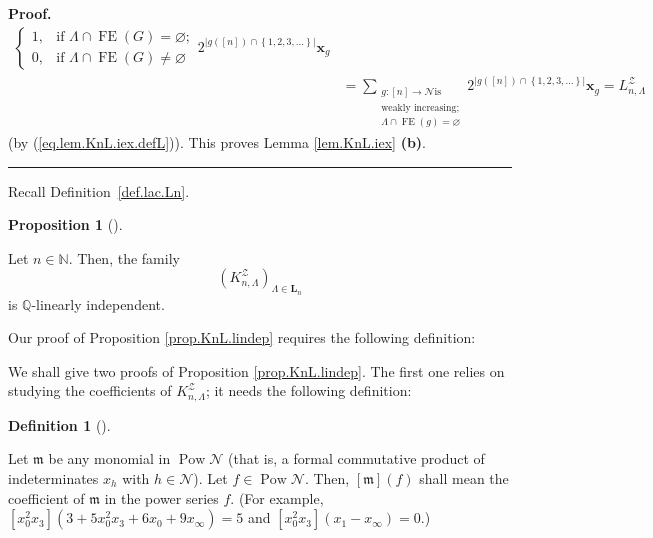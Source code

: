 \documentclass[numbers=enddot,12pt,final,onecolumn,notitlepage]{scrartcl}%
\theoremstyle{definition}
\newtheorem{prop}[theo]{Proposition}
\newenvironment{proposition}[1][]
{\begin{prop}[#1]\begin{leftbar}}
{\end{leftbar}\end{prop}}
\newtheorem{defi}[theo]{Definition}
\newenvironment{definition}[1][]
{\begin{defi}[#1]\begin{leftbar}}
{\end{leftbar}\end{defi}}
\newenvironment{proof}[1][Proof]{\noindent\textbf{#1.} }{\ \rule{0.5em}{0.5em}}
\newenvironment{verlong}{}{}
\newenvironment{vershort}{}{}
\let\sumnonlimits\sum
\renewcommand{\sum}{\sumnonlimits\limits}
\begin{document}
\begin{verlong}
\begin{proof}
\begin{align*}
\begin{cases}
1, & \text{if }\Lambda\cap\operatorname*{FE}\left(  G\right)  =\varnothing;\\
0, & \text{if }\Lambda\cap\operatorname*{FE}\left(  G\right)  \neq\varnothing
\end{cases}
2^{\left\vert g\left(  \left[  n\right]  \right)  \cap\left\{  1,2,3,\ldots
\right\}  \right\vert }\mathbf{x}_{g}\\
&  =\sum_{\substack{g:\left[  n\right]  \rightarrow\mathcal{N}\text{
is}\\\text{weakly increasing;}\\\Lambda\cap\operatorname*{FE}\left(  g\right)
=\varnothing}}2^{\left\vert g\left(  \left[  n\right]  \right)  \cap\left\{
1,2,3,\ldots\right\}  \right\vert }\mathbf{x}_{g}=L_{n,\Lambda}^{\mathcal{Z}}%
\end{align*}
(by (\ref{eq.lem.KnL.iex.defL})). This proves Lemma \ref{lem.KnL.iex}
\textbf{(b)}.
\end{proof}
\end{verlong}

Recall Definition~\ref{def.lac.Ln}.

\begin{proposition}
\label{prop.KnL.lindep}Let $n\in\mathbb{N}$. Then, the family%
\[
\left(  K_{n,\Lambda}^{\mathcal{Z}}\right)  _{\Lambda\in \mathbf{L}_n}%
\]
is $\mathbb{Q}$-linearly independent.
\end{proposition}

\begin{vershort}
Our proof of Proposition \ref{prop.KnL.lindep} requires
the following definition:
\end{vershort}

\begin{verlong}
We shall give two proofs of Proposition \ref{prop.KnL.lindep}. The first one
relies on studying the coefficients of $K_{n,\Lambda}^{\mathcal{Z}}$; it needs
the following definition:
\end{verlong}

\begin{definition}
Let $\mathfrak{m}$ be any monomial in $\operatorname*{Pow}\mathcal{N}$ (that
is, a formal commutative product of indeterminates $x_{h}$ with $h\in
\mathcal{N}$). Let $f\in\operatorname*{Pow}\mathcal{N}$. Then, $\left[
\mathfrak{m}\right]  \left(  f\right)  $ shall mean the coefficient of
$\mathfrak{m}$ in the power series $f$. (For example, $\left[  x_{0}^{2}%
x_{3}\right]  \left(  3+5x_{0}^{2}x_{3}+6x_{0}+9x_{\infty}\right)  =5$ and
$\left[  x_{0}^{2}x_{3}\right]  \left(  x_{1}-x_{\infty}\right)  =0$.)
\end{definition}
\end{document}
